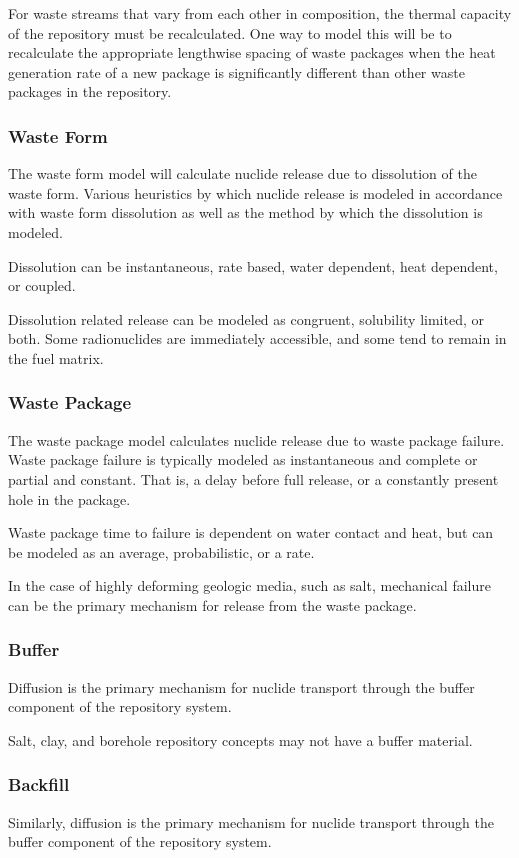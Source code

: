 For waste streams that vary from each other in composition, the thermal capacity 
of the repository must be recalculated. One way to model this will be to 
recalculate the appropriate lengthwise spacing of waste packages when the heat 
generation rate of a new package is significantly different than other waste 
packages in the repository. 

\subsubsection{Waste Form}
The waste form model will calculate nuclide release due to dissolution 
of the waste form. Various heuristics by which nuclide release is modeled in 
accordance with waste form dissolution as well as the method by which 
the dissolution is modeled.

Dissolution can be instantaneous, rate based, water dependent, heat 
dependent, or coupled.

Dissolution related release can be modeled as congruent, solubility 
limited, or both. Some radionuclides are immediately accessible, and some 
tend to remain in the fuel matrix. 

\subsubsection{Waste Package}
The waste package model calculates nuclide release due to waste 
package failure. Waste package failure is typically modeled as 
instantaneous and complete or partial and constant. That is, a delay 
before full release, or a constantly present hole in the package.

Waste package time to failure is dependent on water contact and heat, 
but can be modeled as an average, probabilistic, or a rate.

In the case of highly deforming geologic media, such as salt, 
mechanical failure can be the primary mechanism for release from the 
waste package.

\subsubsection{Buffer}
Diffusion is the primary mechanism for nuclide transport through the 
buffer component of the repository system.  

Salt, clay, and borehole repository concepts may not have a buffer 
material.

\subsubsection{Backfill}
Similarly, diffusion is the primary mechanism for nuclide transport 
through the buffer component of the repository system.

